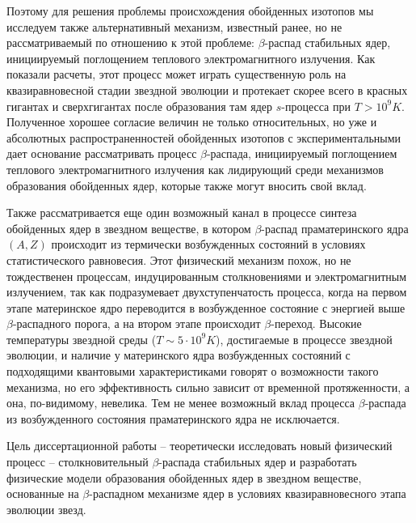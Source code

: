 Поэтому для решения проблемы происхождения обойденных изотопов мы исследуем
также
альтернативный механизм, известный ранее, но не рассматриваемый по отношению к
этой проблеме: $\beta$-распад стабильных ядер, инициируемый
поглощением теплового электромагнитного излучения.
Как показали расчеты, этот процесс может играть существенную роль на
квазиравновесной
стадии звездной эволюции и протекает скорее всего в красных гигантах
и сверхгигантах после образования там ядер $s$-процесса при $T>10^9 K$.
Полученное хорошее согласие
величин не только относительных, но уже и абсолютных распространенностей
обойденных изотопов
с экспериментальными дает основание рассматривать процесс
$\beta$-распада, инициируемый
поглощением теплового электромагнитного излучения
как
лидирующий среди механизмов образования обойденных ядер,
которые также могут вносить свой вклад.

Также рассматривается еще один возможный канал в процессе
синтеза обойденных ядер в звездном веществе,
в котором  $\beta$-распад праматеринского ядра
$(A,Z)$ происходит из термически возбужденных состояний в условиях
статистического равновесия. Этот физический механизм
 похож, но не тождественен процессам, индуцированным столкновениями и
 электромагнитным излучением, так как подразумевает двухступенчатость
процесса, когда на первом этапе материнское ядро переводится в возбужденное
состояние с энергией выше $\beta$-распадного порога, а на втором этапе
происходит $\beta$-переход. Высокие температуры звездной среды
($T \sim 5\cdot 10^9 K$),
достигаемые в процессе звездной эволюции, и наличие у
материнского ядра возбужденных состояний с подходящими квантовыми
характеристиками говорят о возможности такого механизма, но его
эффективность сильно зависит от временной протяженности, а она, по-видимому,
невелика.
Тем не менее возможный вклад процесса $\beta$-распада из возбужденного
состояния праматеринского ядра не исключается.




Цель диссертационной работы -- теоретически исследовать  новый физический
процесс -- столкновительный $\beta$-распада стабильных
ядер и разработать физические модели образования обойденных ядер в звездном
веществе, основанные на $\beta$-распадном механизме ядер в условиях
квазиравновесного этапа эволюции звезд.


